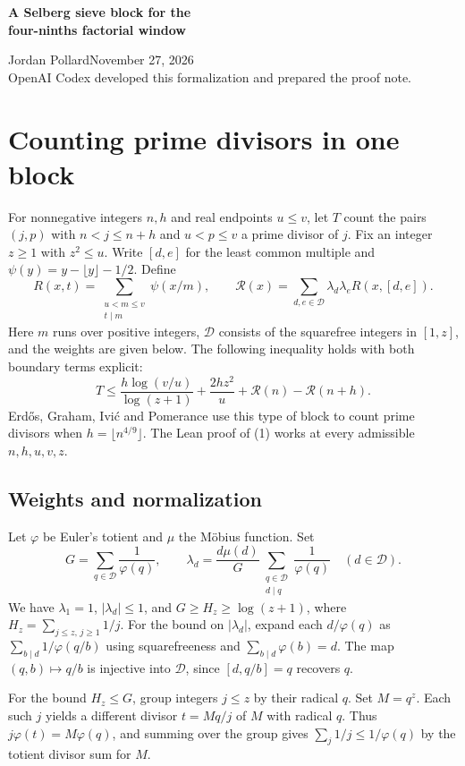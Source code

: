 \documentclass[10pt]{article}
\newcommand{\D}{\mathcal D}
\newcommand{\wtR}{\mathcal R}
\begin{document}
{\LARGE\bfseries A Selberg sieve block for the\\[2pt] four-ninths factorial window\par}
\medskip
Jordan Pollard\hfill November 27, 2026\\
{\small OpenAI Codex developed this formalization and prepared the proof note.}

\section*{Counting prime divisors in one block}
For nonnegative integers $n,h$ and real endpoints $u\le v$, let $T$ count the pairs $(j,p)$ with $n<j\le n+h$ and $u<p\le v$ a prime divisor of $j$. Fix an integer $z\ge1$ with $z^2\le u$. Write $[d,e]$ for the least common multiple and $\psi(y)=y-\lfloor y\rfloor-1/2$. Define
\[
 R(x,t)=\sum_{\substack{u<m\le v\\ t\mid m}}\psi(x/m),
 \qquad \wtR(x)=\sum_{d,e\in\D}\lambda_d\lambda_e R(x,[d,e]).
\]
Here $m$ runs over positive integers, $\D$ consists of the squarefree integers in $[1,z]$, and the weights are given below. The following inequality holds with both boundary terms explicit:
\begin{equation}
 T\le \frac{h\log(v/u)}{\log(z+1)}+\frac{2hz^2}{u}+\wtR(n)-\wtR(n+h).
 \tag{1}
\end{equation}
Erd\H{o}s, Graham, Ivi\'c and Pomerance use this type of block to count prime divisors when $h=\lfloor n^{4/9}\rfloor$. The Lean proof of (1) works at every admissible $n,h,u,v,z$.

\subsection*{Weights and normalization}
Let $\varphi$ be Euler's totient and $\mu$ the M\"obius function. Set
\[
 G=\sum_{q\in\D}\frac1{\varphi(q)},\qquad
 \lambda_d=\frac{d\mu(d)}{G}
             \sum_{\substack{q\in\D\\d\mid q}}\frac1{\varphi(q)}
 \quad(d\in\D).
\]
We have $\lambda_1=1$, $|\lambda_d|\le1$, and $G\ge H_z\ge\log(z+1)$, where $H_z=\sum_{j\le z,\,j\ge1}1/j$. For the bound on $|\lambda_d|$, expand each $d/\varphi(q)$ as $\sum_{b\mid d}1/\varphi(q/b)$ using squarefreeness and $\sum_{b\mid d}\varphi(b)=d$. The map $(q,b)\mapsto q/b$ is injective into $\D$, since $[d,q/b]=q$ recovers $q$.

For the bound $H_z\le G$, group integers $j\le z$ by their radical $q$. Set $M=q^z$. Each such $j$ yields a different divisor $t=Mq/j$ of $M$ with radical $q$. Thus $j\varphi(t)=M\varphi(q)$, and summing over the group gives $\sum_j 1/j\le 1/\varphi(q)$ by the totient divisor sum for $M$.
\end{document}
